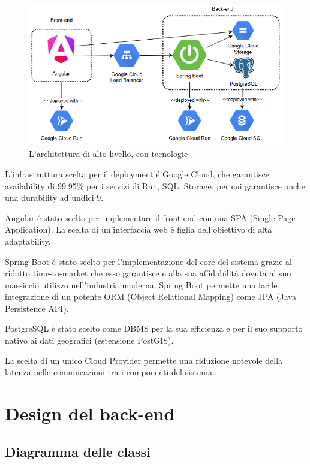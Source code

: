 \begin{figure}[h]
    \centering
    \includegraphics[width=\textwidth]{assets/diagrams/high-level-arch-tecnologies.png}
    \caption{L'architettura di alto livello, con tecnologie}
    \label{fig:Architettura di alto livello, con tecnologie}
\end{figure}

L'infrastruttura scelta per il deployment é Google Cloud, che garantisce availability 
di 99.95\% per i servizi di Run, SQL, Storage, per cui garantisce anche una durability 
ad undici 9.

Angular é stato scelto per implementare il front-end con una SPA (Single Page 
Application). La scelta di un'interfaccia web è figlia dell'obiettivo di alta 
adaptability.

Spring Boot é stato scelto per l'implementazione del core del sistema grazie al ridotto 
time-to-market che esso garantisce e alla sua affidabilitá dovuta al suo massiccio 
utilizzo nell'industria moderna. Spring Boot permette una facile integrazione di un 
potente ORM (Object Relational Mapping) come JPA (Java Persistence API).

PostgreSQL è stato scelto come DBMS per la sua efficienza e per il suo supporto nativo 
ai dati geografici (estensione PostGIS).

La scelta di un unico Cloud Provider permette una riduzione notevole della latenza nelle 
comunicazioni tra i componenti del sistema.

\section{Design del back-end}
\subsection{Diagramma delle classi}


